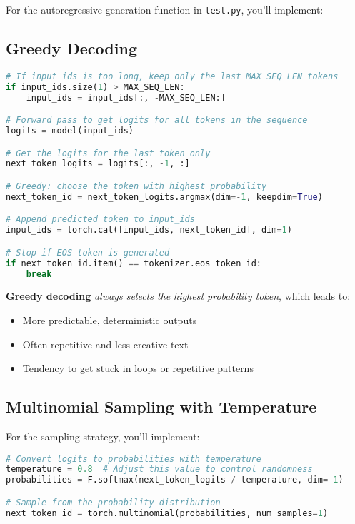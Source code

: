 For the autoregressive generation function in \texttt{test.py}, you'll implement:

\subsection*{Greedy Decoding}

\begin{lstlisting}[language=Python]
# If input_ids is too long, keep only the last MAX_SEQ_LEN tokens
if input_ids.size(1) > MAX_SEQ_LEN:
    input_ids = input_ids[:, -MAX_SEQ_LEN:]

# Forward pass to get logits for all tokens in the sequence
logits = model(input_ids)

# Get the logits for the last token only
next_token_logits = logits[:, -1, :]

# Greedy: choose the token with highest probability
next_token_id = next_token_logits.argmax(dim=-1, keepdim=True)

# Append predicted token to input_ids
input_ids = torch.cat([input_ids, next_token_id], dim=1)

# Stop if EOS token is generated
if next_token_id.item() == tokenizer.eos_token_id:
    break
\end{lstlisting}

\textbf{Greedy decoding} \emph{always selects the highest probability token}, which leads to:

\begin{itemize}
    \item More predictable, deterministic outputs
    \item Often repetitive and less creative text
    \item Tendency to get stuck in loops or repetitive patterns
\end{itemize}
\subsection*{Multinomial Sampling with Temperature}

For the sampling strategy, you'll implement:

\begin{lstlisting}[language=Python]
# Convert logits to probabilities with temperature
temperature = 0.8  # Adjust this value to control randomness
probabilities = F.softmax(next_token_logits / temperature, dim=-1)

# Sample from the probability distribution
next_token_id = torch.multinomial(probabilities, num_samples=1)
\end{lstlisting}

